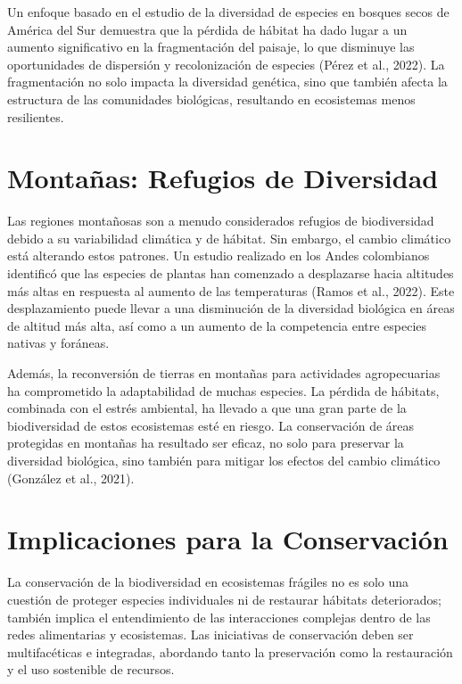 \documentclass[
  letterpaper,
  DIV=11,
  numbers=noendperiod,
  oneside]{scrreprt}
\begin{document}
Un enfoque basado en el estudio de la diversidad de especies en bosques
secos de América del Sur demuestra que la pérdida de hábitat ha dado
lugar a un aumento significativo en la fragmentación del paisaje, lo que
disminuye las oportunidades de dispersión y recolonización de especies
(Pérez et al., 2022). La fragmentación no solo impacta la diversidad
genética, sino que también afecta la estructura de las comunidades
biológicas, resultando en ecosistemas menos resilientes.

\section{Montañas: Refugios de
Diversidad}\label{montauxf1as-refugios-de-diversidad}

Las regiones montañosas son a menudo considerados refugios de
biodiversidad debido a su variabilidad climática y de hábitat. Sin
embargo, el cambio climático está alterando estos patrones. Un estudio
realizado en los Andes colombianos identificó que las especies de
plantas han comenzado a desplazarse hacia altitudes más altas en
respuesta al aumento de las temperaturas (Ramos et al., 2022). Este
desplazamiento puede llevar a una disminución de la diversidad biológica
en áreas de altitud más alta, así como a un aumento de la competencia
entre especies nativas y foráneas.

Además, la reconversión de tierras en montañas para actividades
agropecuarias ha comprometido la adaptabilidad de muchas especies. La
pérdida de hábitats, combinada con el estrés ambiental, ha llevado a que
una gran parte de la biodiversidad de estos ecosistemas esté en riesgo.
La conservación de áreas protegidas en montañas ha resultado ser eficaz,
no solo para preservar la diversidad biológica, sino también para
mitigar los efectos del cambio climático (González et al., 2021).

\section{Implicaciones para la
Conservación}\label{implicaciones-para-la-conservaciuxf3n-2}

La conservación de la biodiversidad en ecosistemas frágiles no es solo
una cuestión de proteger especies individuales ni de restaurar hábitats
deteriorados; también implica el entendimiento de las interacciones
complejas dentro de las redes alimentarias y ecosistemas. Las
iniciativas de conservación deben ser multifacéticas e integradas,
abordando tanto la preservación como la restauración y el uso sostenible
de recursos.
\end{document}

